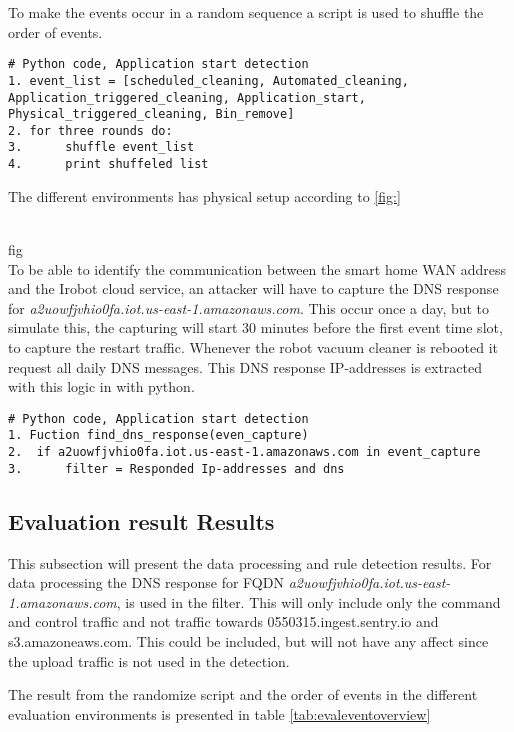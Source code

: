 To make the events occur in a random sequence a script is used to shuffle the order of events. 
\begin{lstlisting}
# Python code, Application start detection
1. event_list = [scheduled_cleaning, Automated_cleaning, Application_triggered_cleaning, Application_start, Physical_triggered_cleaning, Bin_remove]
2. for three rounds do:
3.      shuffle event_list
4.      print shuffeled list
\end{lstlisting}

The different environments has physical setup according to \ref{fig:} 

\\
fig
\\

To be able to identify the communication between the smart home WAN address and the Irobot cloud service, an attacker will have to capture the DNS response for \textit{a2uowfjvhio0fa.iot.us-east-1.amazonaws.com}. This occur once a day, but to simulate this, the capturing will start 30 minutes before the first event time slot, to capture the restart traffic. Whenever the robot vacuum cleaner is rebooted it request all daily DNS messages. This DNS response IP-addresses is extracted with this logic in with python.

\begin{lstlisting}
# Python code, Application start detection
1. Fuction find_dns_response(even_capture)
2.  if a2uowfjvhio0fa.iot.us-east-1.amazonaws.com in event_capture
3.      filter = Responded Ip-addresses and dns
\end{lstlisting}


\subsection{Evaluation result Results}
This subsection will present the data processing and rule detection results. For data processing the DNS response for FQDN \textit{a2uowfjvhio0fa.iot.us-east-1.amazonaws.com}, is used in the filter. This will only include only the command and control traffic and not traffic towards 0550315.ingest.sentry.io and s3.amazoneaws.com. This could be included, but will not have any affect since the upload traffic is not used in the detection. 

The result from the randomize script and the order of events in the different evaluation environments is presented in table \ref{tab:evaleventoverview}

